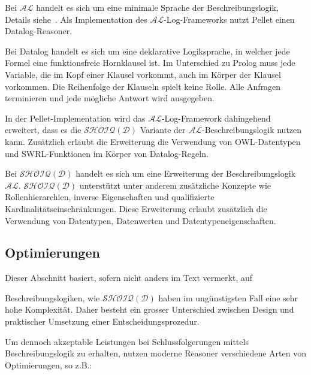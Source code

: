 Bei $\mathcal{AL}$ handelt es sich um eine minimale Sprache der Beschreibungslogik, Details siehe~\cite[S. 51]{dl:baader2003}. Als Implementation des $\mathcal{AL}$-Log-Frameworks nutzt Pellet einen Datalog-Reasoner.~\cite[S. 4 - 5]{sirin:pellet07}

Bei Datalog handelt es sich um eine deklarative Logiksprache, in welcher jede Formel eine funktionsfreie Hornklausel ist. Im Unterschied zu Prolog muss jede Variable, die im Kopf einer Klausel vorkommt, auch im Körper der Klausel vorkommen. Die Reihenfolge der Klauseln spielt keine Rolle. Alle Anfragen terminieren und jede mögliche Antwort wird ausgegeben.~\cite{datalog}

In der Pellet-Implementation wird das $\mathcal{AL}$-Log-Framework dahingehend erweitert, dass es die $\mathcal{SHOIQ}(\mathcal{D})$ Variante  der $\mathcal{AL}$-Beschreibungslogik nutzen kann. Zusätzlich erlaubt die Erweiterung die Verwendung von OWL-Datentypen und SWRL-Funktionen im Körper von Datalog-Regeln.~\cite[S. 5]{sirin:pellet07}

Bei $\mathcal{SHOIQ}(\mathcal{D})$ handelt es sich um eine Erweiterung der Beschreibungslogik $\mathcal{AL}$. $\mathcal{SHOIQ}(\mathcal{D})$ unterstützt unter anderem zusätzliche Konzepte wie Rollenhierarchien, inverse Eigenschaften und qualifizierte Kardinalitätseinschränkungen. Diese Erweiterung erlaubt zusätzlich die Verwendung von Datentypen, Datenwerten und Datentypeneigenschaften.~\cite{wiki:desclog}

\subsection{Optimierungen}
\label{subsection:inferenz_pellet_opti}
Dieser Abschnitt basiert, sofern nicht anders im Text vermerkt, auf~\cite[S. 16 - 19]{sirin:pellet05}

Beschreibungslogiken, wie $\mathcal{SHOIQ}(\mathcal{D})$ haben im ungünstigsten Fall eine sehr hohe Komplexität. Daher besteht ein grosser Unterschied zwischen Design und praktischer Umsetzung einer Entscheidungsprozedur.

Um dennoch akzeptable Leistungen bei Schlussfolgerungen mittels Beschreibungslogik zu erhalten, nutzen moderne Reasoner verschiedene Arten von Optimierungen, so z.B.:

